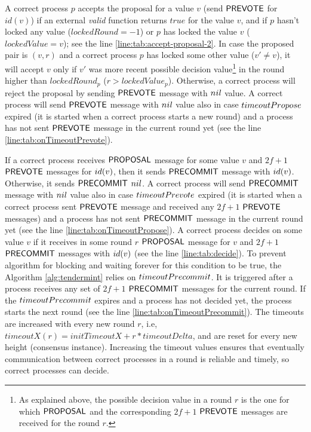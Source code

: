 A correct process $p$ accepts the proposal for a value $v$  (send $\mathsf{PREVOTE}$ for $id(v)$) if an external \emph{valid} function returns $true$ for the value $v$,
and if $p$ hasn't locked any value ($lockedRound = -1$) or $p$ has locked the value $v$ ($lockedValue = v$); see the line \ref{line:tab:accept-proposal-2}. 
In case the proposed pair is $(v,r)$ and a correct process $p$ has locked some other value ($v' \neq v$), it will accept $v$ only if $v'$ was more recent possible decision value\footnote{As explained above, the possible decision value in a round $r$ is the one for which $\mathsf{PROPOSAL}$ and the corresponding $2f+1$ $\mathsf{PREVOTE}$ messages are received for the round $r$.} in the round higher than $lockedRound_p$ ($r > lockedValue_p$).   
Otherwise, a correct process will reject the proposal by sending $\mathsf{PREVOTE}$ message with $nil$ value. A correct process will send $\mathsf{PREVOTE}$ message with $nil$ value also in case $timeoutPropose$ expired (it is started when a correct process starts a new round) and a process has not sent $\mathsf{PREVOTE}$ message in the current round yet (see the line \ref{line:tab:onTimeoutPrevote}). 

If a correct process receives $\mathsf{PROPOSAL}$ message for some value $v$ and $2f+1$ $\mathsf{PREVOTE}$
messages for $id(v)$, then it sends $\mathsf{PRECOMMIT}$ message with $id(v)$. Otherwise, it sends $\mathsf{PRECOMMIT}$ $nil$. A correct process will send $\mathsf{PRECOMMIT}$ message with $nil$ value also in case $timeoutPrevote$ expired (it is started when a correct process sent $\mathsf{PREVOTE}$ message and received any $2f+1$ $\mathsf{PREVOTE}$ messages)  and a process has not sent $\mathsf{PRECOMMIT}$ message in the current round yet (see the line \ref{line:tab:onTimeoutPropose}). 
A correct process decides on some value $v$ if it receives in some round $r$ $\mathsf{PROPOSAL}$ message for $v$ and $2f+1$ $\mathsf{PRECOMMIT}$ messages with $id(v)$ (see the line \ref{line:tab:decide}).  
To prevent algorithm for blocking and waiting forever for this condition to be true, the Algorithm \ref{alg:tendermint} relies on $timeoutPrecommit$. It is triggered after a process receives any set of $2f+1$ $\mathsf{PRECOMMIT}$ messages for the current round. If the $timeoutPrecommit$ expires and a process has not decided yet, the process starts the next round (see the line \ref{line:tab:onTimeoutPrecommit}).  
The timeouts are increased with every new round $r$, i.e, $timeoutX(r) = initTimeoutX + r*timeoutDelta$, and are reset for every new height (consensus instance). Increasing the timeout values ensures that eventually communication between correct processes in a round is reliable and timely, so correct processes can decide. 

